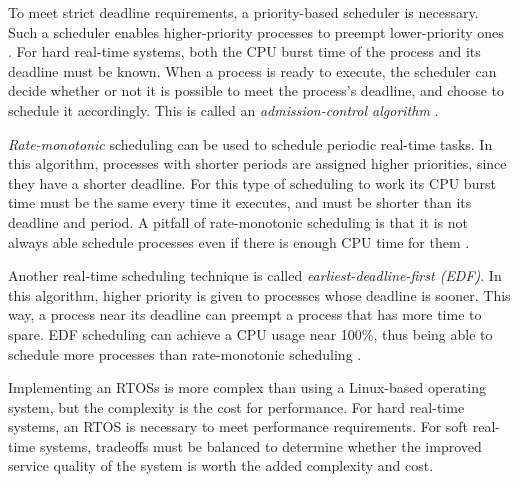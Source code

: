     To meet strict deadline requirements, a priority-based scheduler is
        necessary.
    Such a scheduler enables higher-priority processes to preempt lower-priority
        ones \cite[p. 229]{textbook}.
    For hard real-time systems, both the CPU burst time of the process and its
        deadline must be known.
    When a process is ready to execute, the scheduler can decide whether or not
        it is possible to meet the process's deadline, and choose to schedule it
        accordingly.
    This is called an \textit{admission-control algorithm}
        \cite[pp. 229-230]{textbook}.

    \textit{Rate-monotonic} scheduling can be used to schedule periodic real-time tasks.
    In this algorithm, processes with shorter periods are assigned higher
        priorities, since they have a shorter deadline.
    For this type of scheduling to work its CPU burst time must be the same
        every time it executes, and must be shorter than its deadline and
        period.
    A pitfall of rate-monotonic scheduling is that it is not always able
        schedule processes even if there is enough CPU time for them
        \cite[pp. 230-232]{textbook}.

    Another real-time scheduling technique is called
        \textit{earliest-deadline-first (EDF)}.
    In this algorithm, higher priority is given to processes whose deadline is
        sooner.
    This way, a process near its deadline can preempt a process that has more
        time to spare.
    EDF scheduling can achieve a CPU usage near 100\%, thus being able to
        schedule more processes than rate-monotonic scheduling
        \cite[pp. 232-233]{textbook}.

    Implementing an RTOSs is more complex than using a Linux-based operating
        system, but the complexity is the cost for performance.
    For hard real-time systems, an RTOS is necessary to meet performance
        requirements.
    For soft real-time systems, tradeoffs must be balanced to determine whether
        the improved service quality of the system is worth the added complexity
        and cost.
